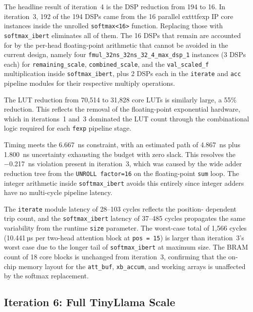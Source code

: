 The headline result of iteration~4 is the DSP reduction from 194 to 16. In
iteration~3, 192 of the 194 DSPs came from the 16 parallel 	exttt{fexp} IP core instances inside the unrolled
\texttt{softmax<16>} function. Replacing those with \texttt{softmax\_ibert}
eliminates all of them. The 16 DSPs that remain are accounted for by the
per-head floating-point arithmetic that cannot be avoided in the current design,
namely four \texttt{fmul\_32ns\_32ns\_32\_4\_max\_dsp\_1} instances (3 DSPs each) for
\texttt{remaining\_scale}, \texttt{combined\_scale}, and the
\texttt{val\_scaled\_f} multiplication inside \texttt{softmax\_ibert}, plus
2 DSPs each in the \texttt{iterate} and \texttt{acc} pipeline modules for their
respective multiply operations.

The LUT reduction from 70{,}514 to 31{,}828 core LUTs is similarly large,
a 55\% reduction. This reflects the removal of the floating-point exponential
hardware, which in iterations~1 and~3 dominated the LUT count through the
combinational logic required for each \texttt{fexp} pipeline stage.

Timing meets the \SI{6.667}{\nano\second} constraint, with an estimated path
of \SI{4.867}{\nano\second} plus \SI{1.800}{\nano\second} uncertainty
exhausting the budget with zero slack. This resolves the
\SI{-0.217}{\nano\second} violation present in iteration~3, which was
caused by the wide adder reduction tree from the \texttt{UNROLL factor=16}
on the floating-point \texttt{sum} loop. The integer arithmetic inside
\texttt{softmax\_ibert} avoids this entirely since integer adders have no
multi-cycle pipeline latency.

The \texttt{iterate} module latency of 28--103 cycles reflects the position-
dependent trip count, and the \texttt{softmax\_ibert} latency of 37--485 cycles
propagates the same variability from the runtime \texttt{size} parameter. The
worst-case total of 1{,}566 cycles (10.441\,µs per two-head attention block at
\texttt{pos\,=\,15}) is larger than iteration~3's worst case due to the longer
tail of \texttt{softmax\_ibert} at maximum size. The BRAM count of 18 core
blocks is unchanged from iteration~3, confirming that the on-chip memory
layout for the \texttt{att\_buf}, \texttt{xb\_accum}, and working arrays is
unaffected by the softmax replacement.

\subsection{Iteration 6: Full TinyLlama Scale}
\label{subsec:attn_update3}

